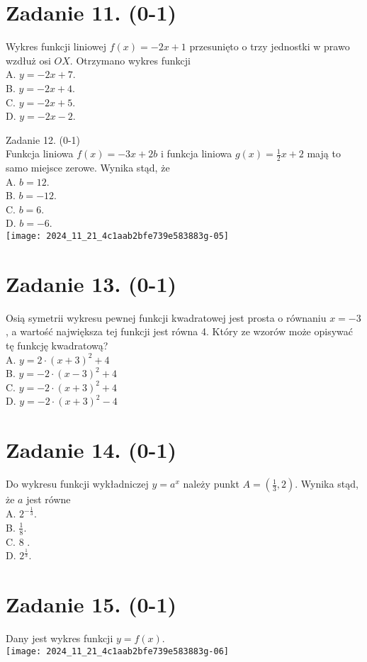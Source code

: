 \documentclass[10pt]{article}
\begin{document}
\section*{Zadanie 11. (0-1)}
Wykres funkcji liniowej \(f(x)=-2 x+1\) przesunięto o trzy jednostki w prawo wzdłuż osi \(O X\). Otrzymano wykres funkcji\\
A. \(y=-2 x+7\).\\
B. \(y=-2 x+4\).\\
C. \(y=-2 x+5\).\\
D. \(y=-2 x-2\).

Zadanie 12. (0-1)\\
Funkcja liniowa \(f(x)=-3 x+2 b\) i funkcja liniowa \(g(x)=\frac{1}{2} x+2\) mają to samo miejsce zerowe. Wynika stąd, że\\
A. \(b=12\).\\
B. \(b=-12\).\\
C. \(b=6\).\\
D. \(b=-6\).\\
\texttt{[image: 2024\_11\_21\_4c1aab2bfe739e583883g-05]}

\section*{Zadanie 13. (0-1)}
Osią symetrii wykresu pewnej funkcji kwadratowej jest prosta o równaniu \(x=-3\), a wartość największa tej funkcji jest równa 4. Który ze wzorów może opisywać tę funkcję kwadratową?\\
A. \(y=2 \cdot(x+3)^{2}+4\)\\
B. \(y=-2 \cdot(x-3)^{2}+4\)\\
C. \(y=-2 \cdot(x+3)^{2}+4\)\\
D. \(y=-2 \cdot(x+3)^{2}-4\)

\section*{Zadanie 14. (0-1)}
Do wykresu funkcji wykładniczej \(y=a^{x}\) należy punkt \(A=\left(\frac{1}{3}, 2\right)\). Wynika stąd, że \(a\) jest równe\\
A. \(2^{-\frac{1}{3}}\).\\
B. \(\frac{1}{8}\).\\
C. 8 .\\
D. \(2^{\frac{1}{3}}\).

\section*{Zadanie 15. (0-1)}
Dany jest wykres funkcji \(y=f(x)\).\\
\texttt{[image: 2024\_11\_21\_4c1aab2bfe739e583883g-06]}
\end{document}
